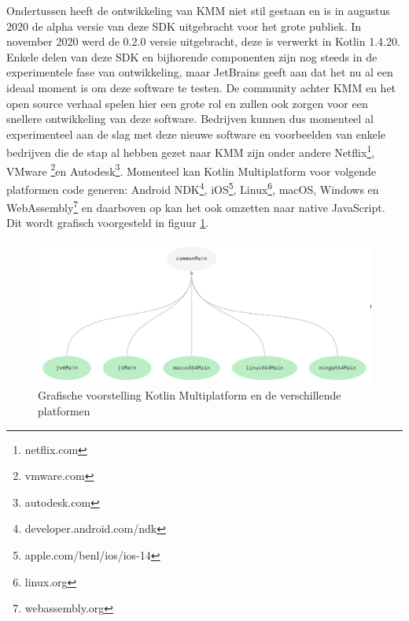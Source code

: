 Ondertussen heeft de ontwikkeling van KMM niet stil gestaan en is in augustus 2020 de alpha versie van deze SDK uitgebracht voor het grote publiek.\autocite{Petrova2020} In november 2020 werd de 0.2.0 versie uitgebracht, deze is verwerkt in Kotlin 1.4.20.\autocite{JetBrains2020} Enkele delen van deze SDK en bijhorende componenten zijn nog steeds in de experimentele fase van ontwikkeling, maar JetBrains geeft aan dat het nu al een ideaal moment is om deze software te testen.\autocite{Petrova2020} De community achter KMM en het open source verhaal spelen hier een grote rol en zullen ook zorgen voor een snellere ontwikkeling van deze software. Bedrijven kunnen dus momenteel al experimenteel aan de slag met deze nieuwe software en voorbeelden van enkele bedrijven die de stap al hebben gezet naar KMM zijn onder andere Netflix\footnote{netflix.com}, VMware \footnote{vmware.com}en Autodesk\footnote{autodesk.com}.\autocite{KotlinKMMCaseStudies} Momenteel kan Kotlin Multiplatform voor volgende platformen code generen: Android NDK\footnote{developer.android.com/ndk}, iOS\footnote{apple.com/benl/ios/ios-14}, Linux\footnote{linux.org}, macOS, Windows en WebAssembly\footnote{webassembly.org} en daarboven op kan het ook omzetten naar native JavaScript.\autocite{Kotlin2021MP} Dit wordt grafisch voorgesteld in figuur \ref{fig:SVZkm-structure}. 

\begin{figure}[h!]
    \includegraphics[width=\linewidth]{img/km-structure.png}
    \caption{Grafische voorstelling Kotlin Multiplatform en de verschillende platformen \autocite{Kotlin2021MP}}
    \label{fig:SVZkm-structure}
\end{figure}

